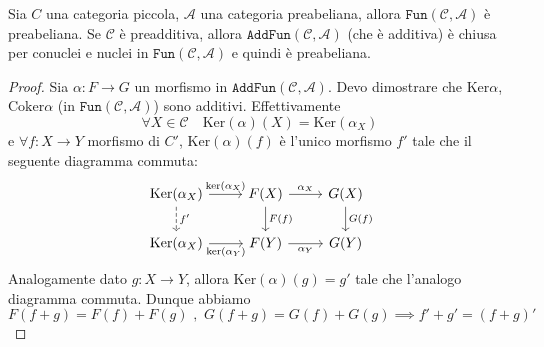 \begin{proposition}{}
    Sia \(C\) una categoria piccola, \(\mathcal{A}\) una categoria preabeliana,
    allora \(\mathtt{Fun}{(\mathcal{C}, \mathcal{A})}\) è preabeliana. Se \(\mathcal{C}\) è preadditiva, allora \(\mathtt{AddFun}{(\mathcal{C}, \mathcal{A})}\) (che è additiva) è chiusa per conuclei e nuclei in \(\mathtt{Fun}{(\mathcal{C}, \mathcal{A})}\) e quindi è preabeliana.
\end{proposition}
\begin{proof}{}
    Sia \(\alpha : F \to G\) un morfismo in \(\mathtt{AddFun}{(\mathcal{C}, \mathcal{A})}\). Devo dimostrare che \(\mathrm{Ker}\alpha\), \(\mathrm{Coker}\alpha\) (in \(\mathtt{Fun}{(\mathcal{C}, \mathcal{A})}\)) sono additivi. Effettivamente
    \[
      \forall X \in \mathcal{C} \quad \mathrm{Ker}(\alpha) {(X)} = \mathrm{Ker}{(\alpha_X)}
    \]
    e \(\forall f : X \to Y\) morfismo di \(C'\), \(\mathrm{Ker}{(\alpha)}{(f)}\) è l'unico morfismo 
    \(f'\) tale che il seguente diagramma commuta:
\[\begin{tikzcd}
	{\mathrm{Ker}(\alpha_X)} & {F(X)} & {G(X)} \\
	{\mathrm{Ker}(\alpha_X)} & {F(Y)} & {G(Y)}
	\arrow["{\mathrm{ker}(\alpha_X)}", from=1-1, to=1-2]
	\arrow["{f'}", dashed, from=1-1, to=2-1]
	\arrow["{\alpha_X}", from=1-2, to=1-3]
	\arrow["{F(f)}", from=1-2, to=2-2]
	\arrow["{G(f)}", from=1-3, to=2-3]
	\arrow["{\mathrm{ker}(\alpha_Y)}"', from=2-1, to=2-2]
	\arrow["{\alpha_Y}"', from=2-2, to=2-3]
\end{tikzcd}\]
    Analogamente dato \(g: X \to Y\), allora \(\mathrm{Ker}{(\alpha)}{(g)} = g'\) tale che l'analogo diagramma commuta. Dunque abbiamo
    \[
      F{(f + g)} = F{(f)} + F{(g)} \,\,,\,\, G{(f + g)} = G{(f)} + G{(g)} \implies
      f' + g' = {(f + g)}'
    \]
\end{proof}


